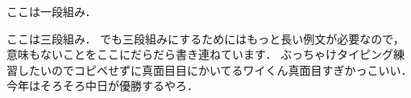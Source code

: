 \documentclass[a4paper, 11pt, uplatex]{jsarticle}
\begin{document}
ここは一段組み．

\begin{multicols}{3}
	ここは三段組み．
	でも三段組みにするためにはもっと長い例文が必要なので，意味もないことをここにだらだら書き連ねています．
	ぶっちゃけタイピング練習したいのでコピペせずに真面目目にかいてるワイくん真面目すぎかっこいい．
	今年はそろそろ中日が優勝するやろ．
\end{multicols}
\end{document}
